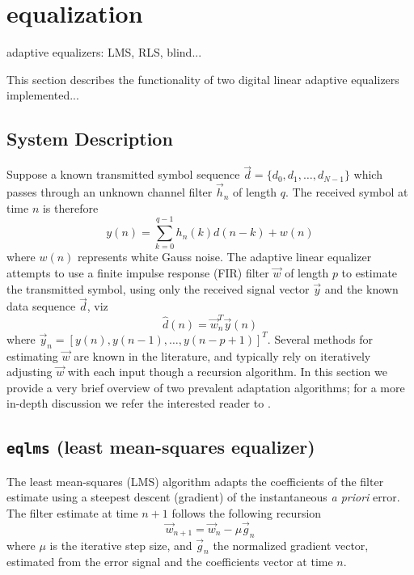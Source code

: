 % 
%

\newpage
\section{equalization}
\label{module:equalization}
adaptive equalizers: LMS, RLS, blind...

This section describes the functionality of two digital linear adaptive
equalizers implemented...

\subsection{System Description}
Suppose a known transmitted symbol sequence
$\vec{d} = \{ d_0, d_1, \ldots ,d_{N-1}\}$
which passes through an unknown channel filter $\vec{h}_n$ of length $q$.
The received symbol at time $n$ is therefore
\[
    y(n) = \sum\limits_{k=0}^{q-1}{h_n(k)d(n-k)} + w(n)
\]
where $w(n)$ represents white Gauss noise.
The adaptive linear equalizer attempts to use a finite impulse response (FIR)
filter $\vec{w}$ of length $p$ to estimate the transmitted symbol, using only
the received signal vector $\vec{y}$ and the known data sequence $\vec{d}$,
viz
\[
    \hat{d}(n) = \vec{w}_n^T \vec{y}(n)
\]
where $\vec{y}_n = [ y(n), y(n-1),\ldots, y(n-p+1) ]^T$.
Several methods for estimating $\vec{w}$ are known in the literature, and
typically rely on iteratively adjusting $\vec{w}$ with each input though a
recursion algorithm.
In this section we provide a very brief overview of two prevalent adaptation
algorithms;
for a more in-depth discussion we refer the interested reader to
\cite{Proakis:2001,Haykin:2002}.

\subsection{{\tt eqlms} (least mean-squares equalizer)}
The least mean-squares (LMS) algorithm adapts the coefficients of the filter
estimate using a steepest descent (gradient) of the instantaneous {\it a priori}
error.
The filter estimate at time $n+1$ follows the following recursion
\begin{equation}
\label{eq:lms:weight_update}
\vec{w}_{n+1} = \vec{w}_{n} - \mu \vec{g}_n
\end{equation}
where $\mu$ is the iterative step size, and
$\vec{g}_n$ the normalized gradient vector, estimated from the error signal
and the coefficients vector at time $n$.

